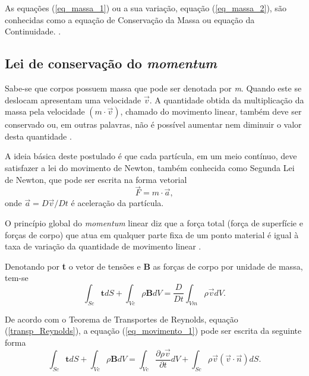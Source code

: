 As equações (\ref{eq_massa_1}) ou a sua variação, equação (\ref{eq_massa_2}), são conhecidas como a equação de Conservação da Massa ou equação da Continuidade. \cite{Lai}.

\subsection{Lei de conservação do \textit{momentum}}

Sabe-se que corpos possuem massa que pode ser denotada por \textit{m}. Quando este se deslocam apresentam uma velocidade $\vec{v}$. A quantidade obtida da multiplicação da massa pela velocidade $(m \cdot \vec{v})$, chamado do movimento linear, também deve ser conservado ou, em outras palavras, não é possível aumentar nem diminuir o valor desta quantidade \cite{Malvern}.

A ideia básica deste postulado é que cada partícula, em um meio contínuo, deve satisfazer a lei do movimento de Newton, também conhecida como Segunda Lei de Newton, que pode ser escrita na forma vetorial
\begin{equation}
\vec{F}= m \cdot \vec{a},
\end{equation}
onde $ \vec{a}= {D \vec{v}}/{Dt}$ é aceleração da partícula.

O princípio global do  \textit{momentum} linear diz que a força total (força de superfície e forças de corpo) que atua em qualquer parte fixa de um ponto material é igual à taxa de variação da quantidade de movimento linear \cite{Lai}. 

Denotando por  \textbf{t} o vetor de tensões e  \textbf{B} as forças de corpo por unidade de massa, tem-se 
\begin{equation} \label{eq_movimento_1}
\int_{Sc} \textbf{t} dS + \int_{Vc} \rho \textbf{B} dV = \dfrac{D}{Dt} \int_{Vm} \rho \vec{v} dV. 
\end{equation}

De acordo com o Teorema de Transportes de Reynolds, equação (\ref{transp_Reynolds}), a equação (\ref{eq_movimento_1}) pode ser escrita da seguinte forma
\begin{equation} \label{eq_movimento_2}
\int_{Sc} \textbf{t} dS + \int_{Vc} \rho \textbf{B} dV = \int_{Vc} \dfrac{ \partial \rho \vec{v}}{ \partial t} dV + \int_{Sc} \rho \vec{v} ( \vec{v} \cdot \vec{n}) dS.
\end{equation}

